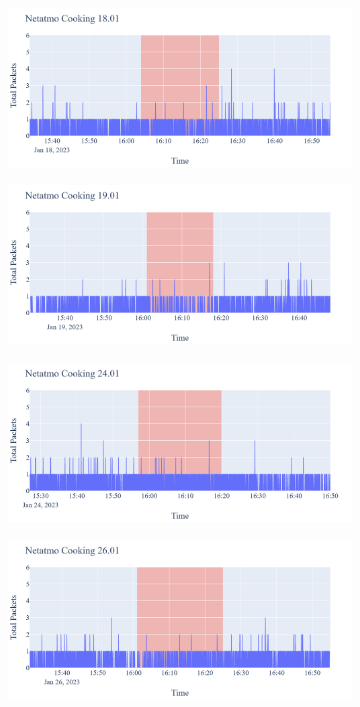 \begin{figure}[H]
\begin{subfigure}[b]{0.5\textwidth}
        \centering
        \includegraphics[width=1.2\hsize]{figures/Netatmo_Cooking_Packets_18.01.png}
    \end{subfigure}
    \begin{subfigure}[b]{0.5\textwidth}
        \centering
        \includegraphics[width=1.2\hsize]{figures/Netatmo_Cooking_Packets_19.01.png}
    \end{subfigure}
    \begin{subfigure}[b]{0.5\textwidth}
        \centering
        \includegraphics[width=1.2\hsize]{figures/Netatmo_Cooking_Packets_24.01.png}
    \end{subfigure}
    \begin{subfigure}[b]{0.5\textwidth}
        \centering
        \includegraphics[width=1.2\hsize]{figures/Netatmo_Cooking_Packets_26.01.png}

\end{subfigure}
\end{figure}
